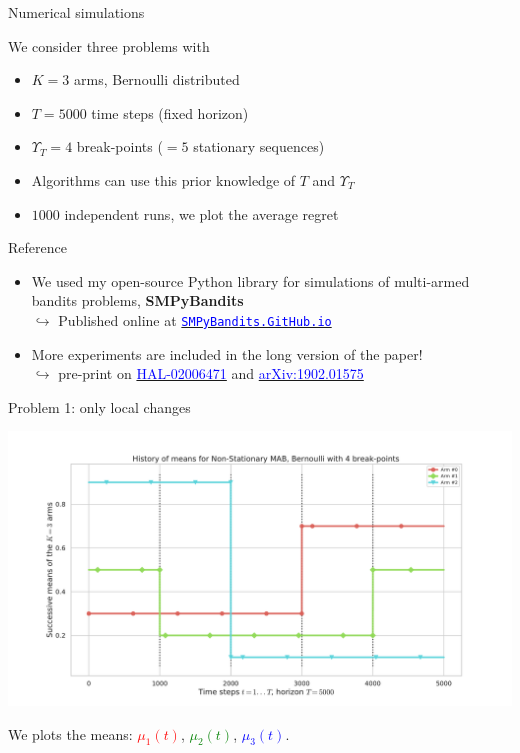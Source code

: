 \documentclass[11pt,english,ignorenonframetext,]{beamer}
\begin{document}
\begin{frame}{Numerical simulations}

  \begin{block}{We consider three problems with}
    \begin{itemize}
      \item
      $K=3$ arms, Bernoulli distributed
      \item
      $T=5000$ time steps (fixed horizon)
      \item
      $\Upsilon_T=4$ break-points ($=5$ stationary sequences)
      \item
      Algorithms can use this prior knowledge of $T$ and $\Upsilon_T$
      \item
      $1000$ independent runs, we plot the average regret
    \end{itemize}
  \end{block}

  \begin{exampleblock}{Reference}
    \begin{itemize}
      \item
      We used my open-source Python library for simulations of multi-armed bandits problems, \textbf{SMPyBandits}\\
      $\hookrightarrow$ Published online at \href{https://SMPyBandits.GitHub.io}{\textcolor{blue}{\texttt{SMPyBandits.GitHub.io}}}
      \item
      More experiments are included in the long version of the paper!\\
      $\hookrightarrow$ pre-print on
      \href{https://hal.inria.fr/hal-02006471}{\textcolor{blue}{HAL-02006471}}
      and
      \href{https://arxiv.org/abs/1902.01575}{\textcolor{blue}{arXiv:1902.01575}}
    \end{itemize}
  \end{exampleblock}

\end{frame}


\begin{frame}[plain]{Problem 1: only local changes}
  \begin{center}
    \includegraphics[width=1.15\textwidth]{figures/Problem_1.pdf}
  \end{center}
  We plots the means:
  \textcolor{red}{$\mu_1(t)$},
  \textcolor{green}{$\mu_2(t)$},
  \textcolor{blue}{$\mu_3(t)$}.
\end{frame}
\end{document}
